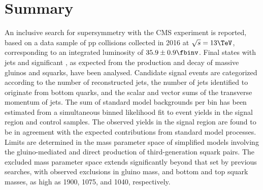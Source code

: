 
\section{Summary}
\label{sec:summary}

An inclusive search for supersymmetry with the CMS experiment is
reported, based on a data sample of pp collisions collected in 2016 at
$\sqrt{s} = 13\TeV$, corresponding to an integrated luminosity of
$35.9 \pm 0.9 \fbinv$. Final states with jets and significant
\ptvecmiss, as expected from the production and decay of massive
gluinos and squarks, have been analysed. Candidate signal events are
categorized according to the number of reconstructed jets, the number
of jets identified to originate from bottom quarks, and the scalar and
vector sums of the transverse momentum of jets. The sum of standard
model backgrounds per bin has been estimated from a simultaneous
binned likelihood fit to event yields in the signal region and control
samples. The observed yields in the signal region are found to be in
agreement with the expected contributions from standard model
processes. Limits are determined in the mass parameter space of
simplified models involving the gluino-mediated and direct production
of third-generation squark pairs. The excluded mass parameter space
extends significantly beyond that set by previous searches, with
observed exclusions in gluino mass, and bottom and top squark masses,
as high as 1900, 1075, and 1040\GeV, respectively.


\clearpage









